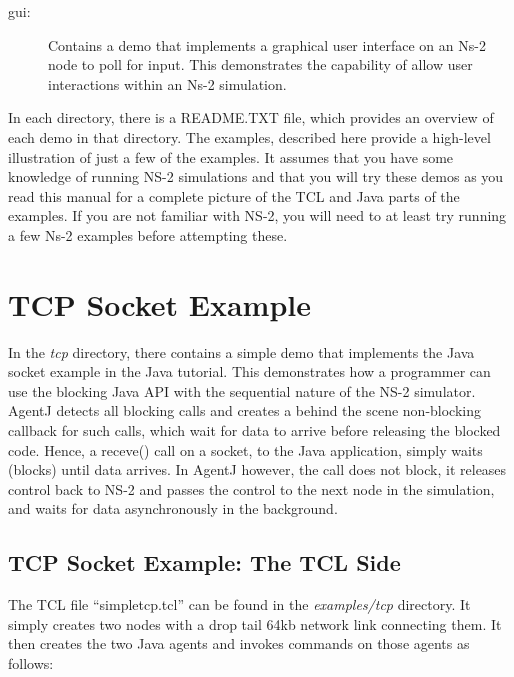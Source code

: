 \begin{description}
\item [gui:] Contains a demo that implements a graphical user interface on an Ns-2 node to poll for input.  This demonstrates the capability of allow user interactions within an Ns-2 simulation.    
\end{description}

In each directory, there is a README.TXT file, which provides an overview of each demo in that directory. The examples, described here provide a high-level illustration of just a few of the examples. It assumes that you have some knowledge of running NS-2 simulations and that you will try these demos as you read this manual for a complete picture of the TCL and Java parts of the examples.  If you are not familiar with NS-2, you will need to at least try running a few Ns-2 examples before attempting these.

 \section{TCP Socket Example}
 \label{sec:tcpdemo}


In the \emph{tcp} directory, there contains a simple demo that implements the Java socket example in the Java tutorial. This demonstrates how a programmer can use the blocking Java API with the sequential nature of the NS-2 simulator.  AgentJ detects all blocking calls and creates a behind the scene non-blocking callback for such calls, which wait for data to arrive before releasing the blocked code.  Hence, a receve() call on a socket, to the Java application, simply waits (blocks) until data arrives. In AgentJ however, the call does not block, it releases control back to NS-2 and passes the control to the next node in the simulation, and waits for data asynchronously in the background.  

 \subsection{TCP Socket Example: The TCL Side}

The TCL file ``simpletcp.tcl'' can be found in the \emph{examples/tcp} directory. It simply creates two nodes with a drop tail 64kb network link connecting them.  It then creates the two Java agents and invokes commands on those agents as follows:

